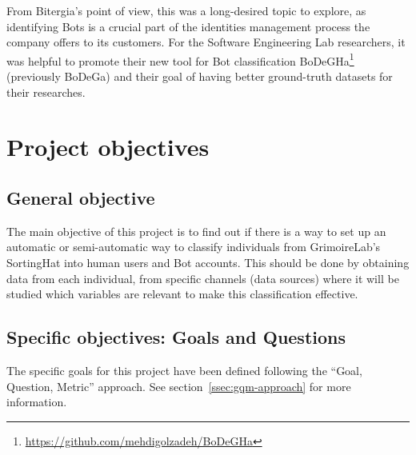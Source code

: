 \documentclass[a4paper, 12pt]{book}
\begin{document}
From Bitergia's point of view, this was a long-desired topic to explore, as identifying Bots is a crucial part of the identities management process the company offers to its customers. For the Software Engineering Lab researchers, it was helpful to promote their new tool for Bot classification BoDeGHa\footnote{\url{https://github.com/mehdigolzadeh/BoDeGHa}} (previously BoDeGa) and their goal of having better ground-truth datasets for their researches.



\section{Project objectives}
\label{sec:objectives}

\subsection{General objective} %
\label{ssec:general-objective} %

The main objective of this project is to find out if there is a way to set up an automatic or semi-automatic way to classify individuals from GrimoireLab’s SortingHat into human users and Bot accounts. This should be done by obtaining data from each individual, from specific channels (data sources) where it will be studied which variables are relevant to make this classification effective.

\subsection{Specific objectives: Goals and Questions}
\label{ssec:specific-objectives}
The specific goals for this project have been defined following the ``Goal, Question, Metric'' approach. See section~\ref{ssec:gqm-approach} for more information.

\end{document}
